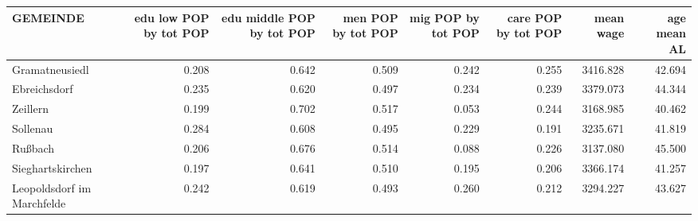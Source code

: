 
\begin{tabular}{lrrrrrrr}
\toprule
GEMEINDE & edu low POP by tot POP & edu middle POP by tot POP & men POP by tot POP & mig POP by tot POP & care POP by tot POP & mean wage & age mean AL\\
\midrule
Gramatneusiedl & 0.208 & 0.642 & 0.509 & 0.242 & 0.255 & 3416.828 & 42.694\\
Ebreichsdorf & 0.235 & 0.620 & 0.497 & 0.234 & 0.239 & 3379.073 & 44.344\\
Zeillern & 0.199 & 0.702 & 0.517 & 0.053 & 0.244 & 3168.985 & 40.462\\
Sollenau & 0.284 & 0.608 & 0.495 & 0.229 & 0.191 & 3235.671 & 41.819\\
Rußbach & 0.206 & 0.676 & 0.514 & 0.088 & 0.226 & 3137.080 & 45.500\\
Sieghartskirchen & 0.197 & 0.641 & 0.510 & 0.195 & 0.206 & 3366.174 & 41.257\\
Leopoldsdorf im Marchfelde & 0.242 & 0.619 & 0.493 & 0.260 & 0.212 & 3294.227 & 43.627\\
\bottomrule
\end{tabular}

